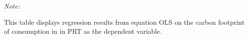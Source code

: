 \begin{table}[htbp!]
\begin{adjustbox}{width = 1\textwidth, max height = 0.95\textheight, center}
\begin{threeparttable}[b]
         \begin{tablenotes}\item \medskip \textit{Note:}
            \item This table displays regression results from equation OLS on the carbon footprint of consumption in  in PRT as the dependent variable.  
         \end{tablenotes}
      \end{threeparttable}
   \end{adjustbox}
\end{table}


